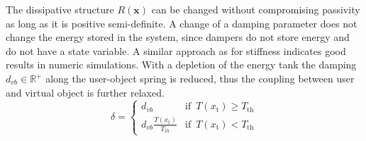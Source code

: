 \documentclass[a4paper,twoside, openright,12pt]{report}
\newcommand{\f}[1]{\boldsymbol{#1}}
\newcommand{\g}[1]{\text{#1}}
\begin{document}
{\begin{eqnarray}
\begin{aligned}
\end{aligned}
\end{eqnarray}
The dissipative structure $R(\f{x})$ can be changed without compromising passivity as long as it is positive semi-definite. A change of a damping parameter does not change the energy stored in the system, since dampers do not store energy and do not have a state variable. A similar approach as for stiffness indicates good results in numeric simulations. With a depletion of the energy tank the damping $d_{vb} \in \mathbb{R}^+$ along the user-object spring is reduced, thus the coupling between user and virtual object is further relaxed.
\begin{equation}
\delta = \begin{cases}
d_{vb} & \text{if } \, T(x_\g{t})\geq T_{\g{th}} \\
d_{vb} \frac{T(x_\g{t})}{T_{th}} & \text{if } \, T(x_\g{t}) < T_{\g{th}}
\end{cases}
\end{equation} 

}
\end{document}
